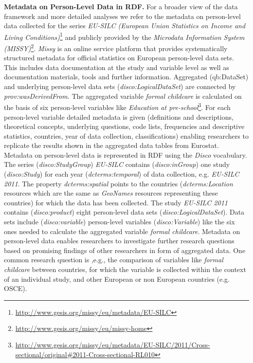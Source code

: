 \documentclass{llncs}
\begin{document}
\textbf{Metadata on Person-Level Data in RDF.}
For a broader view of the data framework and more detailed analyses we refer to the metadata on person-level data collected for the series \emph{EU-SILC (European Union Statistics on Income and Living Conditions)}\footnote{\url{http://www.gesis.org/missy/eu/metadata/EU-SILC}} 
and publicly provided by the \emph{Microdata Information System (MISSY)}\footnote{\url{http://www.gesis.org/missy/eu/missy-home}}.
\emph{Missy} is an online service platform that provides systematically structured metadata for official statistics on European person-level data sets. This includes data documentation at the study and variable level as well as documentation materials, tools and further information. 
Aggregated (qb:DataSet) and underlying person-level data sets (\emph{disco:LogicalDataSet}) are connected by \emph{prov:wasDerivedFrom}. 
The aggregated variable \emph{formal childcare} is calculated on the basis of six person-level variables like 
\emph{Education at pre-school}\footnote{\url{http://www.gesis.org/missy/eu/metadata/EU-SILC/2011/Cross-sectional/original#2011-Cross-sectional-RL010}}.
For each person-level variable detailed metadata is given (definitions and descriptions, theoretical concepts, underlying questions, code lists, frequencies and descriptive statistics, countries, year of data collection, classifications) enabling researchers to replicate the results shown in the aggregated data tables from Eurostat.
Metadata on person-level data is represented in RDF using the \emph{Disco} vocabulary.
The series (\emph{disco:StudyGroup}) \emph{EU-SILC} contains (\emph{disco:inGroup}) one study (\emph{disco:Study}) for each year (\emph{dcterms:temporal}) of data collection, e.g. \emph{EU-SILC 2011}.   
The property \emph{dcterms:spatial} points to the countries (\emph{dcterms:Location} resources which are the same as \emph{GeoNames} resources representing these countries) for which the data has been collected.
The study \emph{EU-SILC 2011} contains (\emph{disco:product}) eight person-level data sets (\emph{disco:LogicalDataSet}).
Data sets include (\emph{disco:variable}) person-level variables (\emph{disco:Variable}) like the six ones needed to calculate the aggregated variable \emph{formal childcare}.
Metadata on person-level data enables researchers to investigate further research questions based on promising findings of other researchers in form of aggregated data.
One common research question is ,e.g., the comparison of variables like 
\emph{formal childcare} between countries, for which the variable is collected within the context of an individual study, and other European or non European countries (e.g. OSCE).
\end{document}
